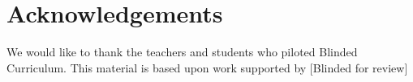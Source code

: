 \documentclass[sigconf,manuscript,review,anonymous]{acmart} %
\newcommand{\hide}[1]{}
\newcommand{\Scratchencore}[0]{Blinded Curriculum}
\begin{document}
\section{Acknowledgements}
\label{sec:ack}
We would like to thank the teachers and students who piloted \Scratchencore{}. This material is based upon work supported by [Blinded for review] %
\hide{}


\balance


\end{document}
